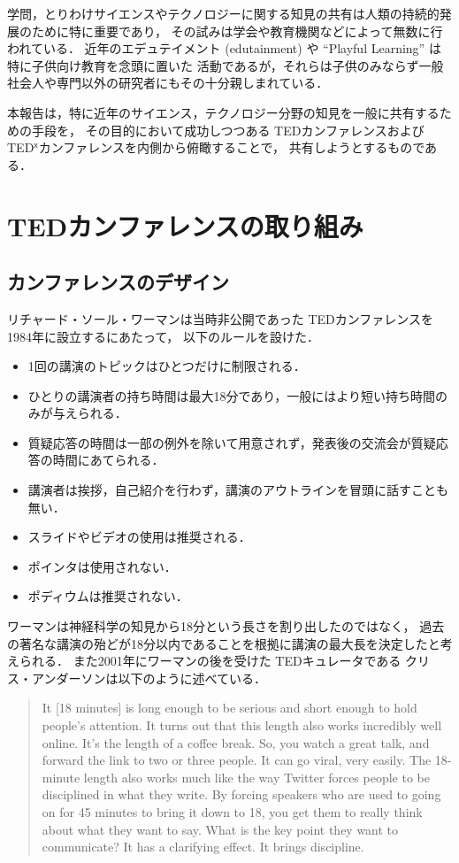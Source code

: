 \documentclass[submit,techreq,noauthor]{ipsj}
\newcommand{\TED}{\textsf{TED}}
\newcommand{\TEDx}{\TED${}^{\textsf{x}}$}
\begin{document}
学問，とりわけサイエンスやテクノロジーに関する知見の共有は人類の持続的発展のために特に重要であり，
その試みは学会や教育機関などによって無数に行われている．
近年のエデュテイメント (edutainment) や ``Playful Learning'' は特に子供向け教育を念頭に置いた
活動であるが，それらは子供のみならず一般社会人や専門以外の研究者にもその十分親しまれている．\cite{nu}



本報告は，特に近年のサイエンス，テクノロジー分野の知見を一般に共有するための手段を，
その目的において成功しつつある \TED カンファレンスおよび \TEDx カンファレンスを内側から俯瞰することで，
共有しようとするものである．


\section{TEDカンファレンスの取り組み}

\subsection{カンファレンスのデザイン}

リチャード・ソール・ワーマンは当時非公開であった \TED カンファレンスを1984年に設立するにあたって，
以下のルールを設けた．
\begin{itemize}
\item 1回の講演のトピックはひとつだけに制限される．
\item ひとりの講演者の持ち時間は最大18分であり，一般にはより短い持ち時間のみが与えられる．
\item 質疑応答の時間は一部の例外を除いて用意されず，発表後の交流会が質疑応答の時間にあてられる．
\item 講演者は挨拶，自己紹介を行わず，講演のアウトラインを冒頭に話すことも無い．
\item スライドやビデオの使用は推奨される．
\item ポインタは使用されない．
\item ポディウムは推奨されない．
\end{itemize}
ワーマンは神経科学の知見から18分という長さを割り出したのではなく，
過去の著名な講演の殆どが18分以内であることを根拠に講演の最大長を決定したと考えられる．\cite{cg}
また2001年にワーマンの後を受けた \TED キュレータである
クリス・アンダーソンは以下のように述べている．\cite{cgweb}
\begin{quote}
It [18 minutes] is long enough to be serious and short enough to hold people's attention.
It turns out that this length also works incredibly well online. It's the length of a 
coffee break. So, you watch a great talk, and forward the link to two or three people. 
It can go viral, very easily. The 18-minute length also works much like the way Twitter 
forces people to be disciplined in what they write. By forcing speakers who are used to 
going on for 45 minutes to bring it down to 18, you get them to really think about what 
they want to say. What is the key point they want to communicate? It has a clarifying 
effect. It brings discipline.
\end{quote}
\end{document}

